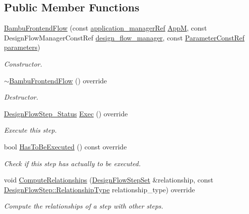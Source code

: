 \subsection*{Public Member Functions}
\begin{DoxyCompactItemize}
\item 
\hyperlink{classBambuFrontendFlow_acebe2814139d097f3ce8ceb387116bcb}{Bambu\+Frontend\+Flow} (const \hyperlink{application__manager_8hpp_a04ccad4e5ee401e8934306672082c180}{application\+\_\+manager\+Ref} \hyperlink{classFrontendFlowStep_a0ac0d8db2a378416583f51c4faa59d15}{AppM}, const Design\+Flow\+Manager\+Const\+Ref \hyperlink{classDesignFlowStep_ab770677ddf087613add30024e16a5554}{design\+\_\+flow\+\_\+manager}, const \hyperlink{Parameter_8hpp_a37841774a6fcb479b597fdf8955eb4ea}{Parameter\+Const\+Ref} \hyperlink{classDesignFlowStep_a802eaafe8013df706370679d1a436949}{parameters})
\begin{DoxyCompactList}\small\item\em Constructor. \end{DoxyCompactList}\item 
\hyperlink{classBambuFrontendFlow_a6e84fa876caa91819720abd15fbf121c}{$\sim$\+Bambu\+Frontend\+Flow} () override
\begin{DoxyCompactList}\small\item\em Destructor. \end{DoxyCompactList}\item 
\hyperlink{design__flow__step_8hpp_afb1f0d73069c26076b8d31dbc8ebecdf}{Design\+Flow\+Step\+\_\+\+Status} \hyperlink{classBambuFrontendFlow_a12e11602383ea4902d93e20f2400eed3}{Exec} () override
\begin{DoxyCompactList}\small\item\em Execute this step. \end{DoxyCompactList}\item 
bool \hyperlink{classBambuFrontendFlow_a44511aa9719eca10142e1e736dec5f08}{Has\+To\+Be\+Executed} () const override
\begin{DoxyCompactList}\small\item\em Check if this step has actually to be executed. \end{DoxyCompactList}\item 
void \hyperlink{classBambuFrontendFlow_a17a62b2f18ad3df23ec7a5418059c465}{Compute\+Relationships} (\hyperlink{classDesignFlowStepSet}{Design\+Flow\+Step\+Set} \&relationship, const \hyperlink{classDesignFlowStep_a723a3baf19ff2ceb77bc13e099d0b1b7}{Design\+Flow\+Step\+::\+Relationship\+Type} relationship\+\_\+type) override
\begin{DoxyCompactList}\small\item\em Compute the relationships of a step with other steps. \end{DoxyCompactList}\end{DoxyCompactItemize}
